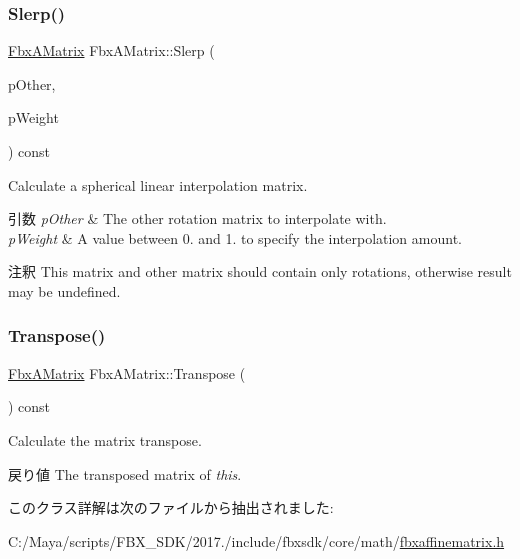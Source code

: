 \mbox{\label{class_fbx_a_matrix_a1dc557020e7cdaa9de99a87a35cc315e}} 
\subsubsection{\texorpdfstring{Slerp()}{Slerp()}}
{\footnotesize\ttfamily \hyperlink{class_fbx_a_matrix}{Fbx\+A\+Matrix} Fbx\+A\+Matrix\+::\+Slerp (\begin{DoxyParamCaption}\item[{const \hyperlink{class_fbx_a_matrix}{Fbx\+A\+Matrix} \&}]{p\+Other,  }\item[{\hyperlink{class_fbx_a_matrix_ad463edbb9fea344643297701f159faa7}{double}}]{p\+Weight }\end{DoxyParamCaption}) const}

Calculate a spherical linear interpolation matrix. 
\begin{DoxyParams}{引数}
{\em p\+Other} & The other rotation matrix to interpolate with. \\
\hline
{\em p\+Weight} & A value between 0. and 1. to specify the interpolation amount. \\
\hline
\end{DoxyParams}
\begin{DoxyRemark}{注釈}
This matrix and other matrix should contain only rotations, otherwise result may be undefined. 
\end{DoxyRemark}
\mbox{\label{class_fbx_a_matrix_a94915f3c5de6c16d4c39a5acc3a84bd7}} 
\subsubsection{\texorpdfstring{Transpose()}{Transpose()}}
{\footnotesize\ttfamily \hyperlink{class_fbx_a_matrix}{Fbx\+A\+Matrix} Fbx\+A\+Matrix\+::\+Transpose (\begin{DoxyParamCaption}{ }\end{DoxyParamCaption}) const}

Calculate the matrix transpose. \begin{DoxyReturn}{戻り値}
The transposed matrix of {\itshape this}. 
\end{DoxyReturn}


このクラス詳解は次のファイルから抽出されました\+:\begin{DoxyCompactItemize}
\item 
C\+:/\+Maya/scripts/\+F\+B\+X\+\_\+\+S\+D\+K/2017./include/fbxsdk/core/math/\hyperlink{fbxaffinematrix_8h}{fbxaffinematrix.\+h}\end{DoxyCompactItemize}
